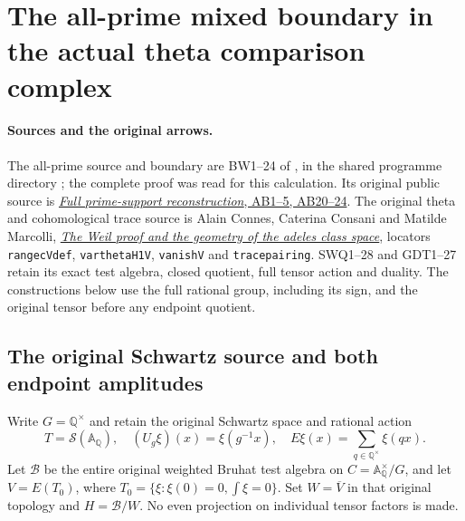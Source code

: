 \section{The all-prime mixed boundary in the actual theta comparison complex}
\label{sec:global-boundary-cone-lift}

\paragraph{Sources and the original arrows.}
The all-prime source and boundary are BW1--24 of
, in the shared
programme directory ; the
complete proof was read for this calculation. Its original
public source is
\href{https://github.com/KokunoYumeto/zeta-function-research-reader/blob/3c78cfbd9e194d35117b33277c421c6564ce3dbf/workbenches/splitzero-tandem/continuations/20260923-full-prime-support/031/01_REBUILT_MATHEMATICS.tex}{\emph{Full prime-support reconstruction}, AB1--5, AB20--24}.
The original theta and cohomological trace source is Alain Connes,
Caterina Consani and Matilde Marcolli,
\href{https://arxiv.org/abs/math/0703392v1}{\emph{The Weil proof and
the geometry of the adeles class space}}, locators
\texttt{rangecVdef}, \texttt{varthetaH1V}, \texttt{vanishV} and
\texttt{tracepairing}. SWQ1--28 and GDT1--27 retain its exact
test algebra, closed quotient, full tensor action and duality.
The constructions below use the full rational group, including
its sign, and the original tensor before any endpoint quotient.

\subsection{The original Schwartz source and both endpoint amplitudes}

Write $G=\mathbb Q^\times$ and retain the original Schwartz space
and rational action
\begin{equation}\tag{GBC1}
 T=\mathcal S(\mathbb A_{\mathbb Q}),\quad
 (U_g\xi)(x)=\xi(g^{-1}x),\quad
 E\xi(x)=\sum_{q\in\mathbb Q^\times}\xi(qx).
\end{equation}
Let $\mathscr B$ be the entire original weighted Bruhat test
algebra on $C=\mathbb A_{\mathbb Q}^\times/G$, and let
$V=E(T_0)$, where $T_0=\{\xi:\xi(0)=0,\int\xi=0\}$.
Set $W=\overline V$ in that original topology and $H=\mathscr B/W$.
No even projection on individual tensor factors is made.

